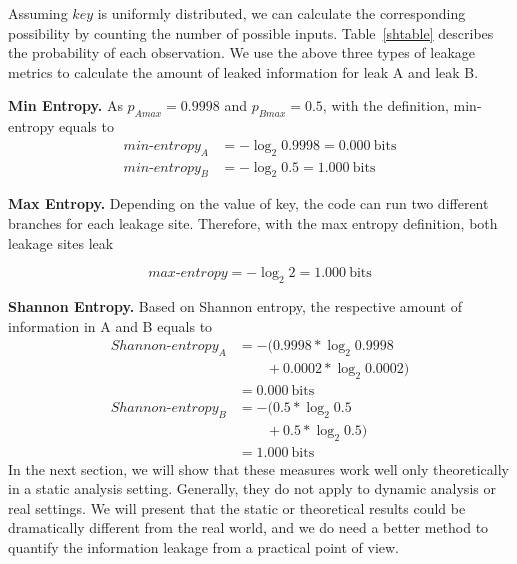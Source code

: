 Assuming $\mathit{key}$ is uniformly distributed, we can calculate the corresponding
possibility by counting the number of possible inputs. Table~\ref{shtable}
describes the probability of each observation. We use the above three types of
leakage metrics to calculate the amount of leaked information for leak A and leak B.

\textbf{Min Entropy.}
As $p_{A\mathit{max}} = 0.9998$ and $p_{B\mathit{max}} = 0.5$,
with the definition, min-entropy equals to
\begin{align*}
    \mathit{min\text{-}entropy_A} & = -\log_2{0.9998} = 0.000\ \mathrm{bits} \\
    \mathit{min\text{-}entropy_B} & = -\log_2{0.5} = 1.000\ \mathrm{bits}
\end{align*}

\textbf{Max Entropy.}
Depending on the value of key, the code can run two different branches for each leakage site.
Therefore, with the max entropy
definition, both leakage sites leak

\begin{displaymath}
    \mathit{max\text{-}entropy} = -\log_2{2} = 1.000\ \mathrm{bits}
\end{displaymath}

\textbf{Shannon Entropy.}
Based on Shannon entropy, the respective amount of information in A and B equals to
    {\footnotesize
        \begin{align*}
            \mathit{Shannon\text{-}entropy_A} & = -(0.9998*\log_{2}0.9998      \\
                                              & \qquad+ 0.0002*\log_{2}0.0002) \\
                                              & = 0.000\ \mathrm{bits}         \\
            \mathit{Shannon\text{-}entropy_B} & = -(0.5*\log_{2}0.5            \\
                                              & \qquad+ 0.5*\log_{2}0.5)       \\
                                              & = 1.000\ \mathrm{bits}
        \end{align*}
    }
In the next section, we will show that these measures work well only
theoretically in a static analysis setting.
Generally, they do not apply to dynamic analysis or real
settings. We will present that the static or theoretical results could be
dramatically different from the real world, and we do need a better method to
quantify the information leakage from a practical point of view.

